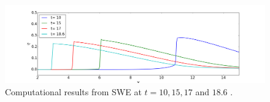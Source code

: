 \documentclass[review]{elsarticle}
\begin{document}

\begin{figure}[!htb]
\centering
\includegraphics[width=\textwidth]{_fig/sw_dx05_time_series.png}
\caption{Computational results from SWE at $t=10,15,17$ and $18.6$ .  }
\label{fig:sw_timeseries}
\end{figure}

\end{document}
